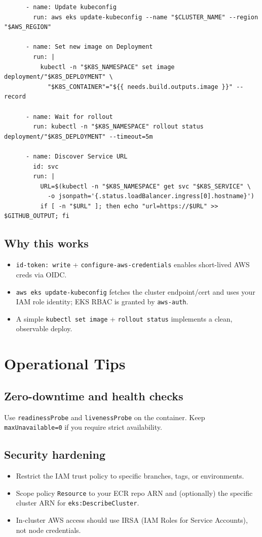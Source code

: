 \documentclass[11pt]{article}
\begin{document}
\begin{verbatim}
      - name: Update kubeconfig
        run: aws eks update-kubeconfig --name "$CLUSTER_NAME" --region "$AWS_REGION"

      - name: Set new image on Deployment
        run: |
          kubectl -n "$K8S_NAMESPACE" set image deployment/"$K8S_DEPLOYMENT" \
            "$K8S_CONTAINER"="${{ needs.build.outputs.image }}" --record

      - name: Wait for rollout
        run: kubectl -n "$K8S_NAMESPACE" rollout status deployment/"$K8S_DEPLOYMENT" --timeout=5m

      - name: Discover Service URL
        id: svc
        run: |
          URL=$(kubectl -n "$K8S_NAMESPACE" get svc "$K8S_SERVICE" \
            -o jsonpath='{.status.loadBalancer.ingress[0].hostname}')
          if [ -n "$URL" ]; then echo "url=https://$URL" >> $GITHUB_OUTPUT; fi
\end{verbatim}
\clearpage

\subsection{Why this works}
\begin{itemize}
  \item \texttt{id-token: write} + \texttt{configure-aws-credentials} enables short-lived AWS creds via OIDC.
  \item \texttt{aws eks update-kubeconfig} fetches the cluster endpoint/cert and uses your IAM role identity; EKS RBAC is granted by \texttt{aws-auth}.
  \item A simple \texttt{kubectl set image} + \texttt{rollout status} implements a clean, observable deploy.
\end{itemize}

\section{Operational Tips}
\subsection{Zero-downtime and health checks}
Use \texttt{readinessProbe} and \texttt{livenessProbe} on the container. Keep \texttt{maxUnavailable=0} if you require strict availability.

\subsection{Security hardening}
\begin{itemize}
  \item Restrict the IAM trust policy to specific branches, tags, or environments.
  \item Scope policy \texttt{Resource} to your ECR repo ARN and (optionally) the specific cluster ARN for \texttt{eks:DescribeCluster}.
  \item In-cluster AWS access should use IRSA (IAM Roles for Service Accounts), not node credentials.
\end{itemize}
\end{document}
